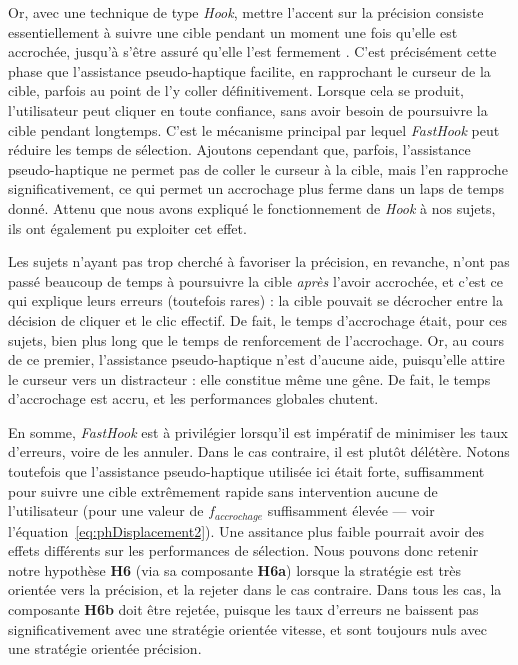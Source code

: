 	Or, avec une technique de type \emph{Hook}, mettre l'accent sur la précision consiste essentiellement à suivre une cible pendant un moment une fois qu'elle est accrochée, jusqu'à s'être assuré qu'elle l'est \og fermement \fg{}. C'est précisément cette phase que l'assistance pseudo-haptique facilite, en rapprochant le curseur de la cible, parfois au point de l'y \og coller \fg{}  définitivement. Lorsque cela se produit, l'utilisateur peut cliquer en toute confiance, sans avoir besoin de poursuivre la cible pendant longtemps. C'est le mécanisme principal par lequel \emph{FastHook} peut réduire les temps de sélection. Ajoutons cependant que, parfois, l'assistance pseudo-haptique ne permet pas de coller le curseur à la cible, mais l'en rapproche significativement, ce qui permet un accrochage plus ferme dans un laps de temps donné. Attenu que nous avons expliqué le fonctionnement de \emph{Hook} à nos sujets, ils ont également pu exploiter cet effet.
	
	Les sujets n'ayant pas trop cherché à favoriser la précision, en revanche, n'ont pas passé beaucoup de temps à poursuivre la cible \emph{après} l'avoir accrochée, et c'est ce qui explique leurs erreurs (toutefois rares) : la cible pouvait se décrocher entre la décision de cliquer et le clic effectif. De fait, le temps d'accrochage était, pour ces sujets, bien plus long que le temps de renforcement de l'accrochage. Or, au cours de ce premier, l'assistance pseudo-haptique n'est d'aucune aide, puisqu'elle attire le curseur vers un distracteur : elle constitue même une gêne. De fait, le temps d'accrochage est accru, et les performances globales chutent.
	
	En somme, \emph{FastHook} est à privilégier lorsqu'il est impératif de minimiser les taux d'erreurs, voire de les annuler. Dans le cas contraire, il est plutôt délétère. Notons toutefois que l'assistance pseudo-haptique utilisée ici était forte, suffisamment pour suivre une cible extrêmement rapide sans intervention aucune de l'utilisateur (pour une valeur de $f_{accrochage}$ suffisamment élevée --- voir l'équation~\ref{eq:phDisplacement2}). Une assitance plus faible pourrait avoir des effets différents sur les performances de sélection. Nous pouvons donc retenir notre hypothèse \textbf{H6} (via sa composante \textbf{H6a}) lorsque la stratégie est très orientée vers la précision, et la rejeter dans le cas contraire. Dans tous les cas, la composante \textbf{H6b} doit être rejetée, puisque les taux d'erreurs ne baissent pas significativement avec une stratégie orientée vitesse, et sont toujours nuls avec une stratégie orientée précision.
	
